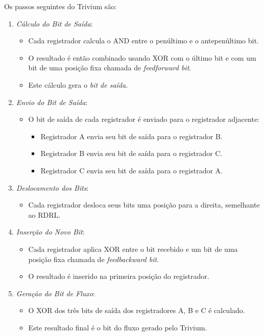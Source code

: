 Os passos seguintes do Trivium são:
\begin{enumerate}
    \item {\em Cálculo do Bit de Saída}:
    \begin{itemize}
        \item Cada registrador calcula o AND entre o penúltimo e o antepenúltimo bit.
        \item O resultado é então combinado usando XOR com o último bit e com um bit de uma posição fixa chamada de {\em feedforward bit}.
        \item Este cálculo gera o \textit{bit de saída}.
    \end{itemize}
    
    \item {\em Envio do Bit de Saída}:
    \begin{itemize}
        \item O bit de saída de cada registrador é enviado para o registrador adjacente:
        \begin{itemize}
            \item Registrador A envia seu bit de saída para o registrador B.
            \item Registrador B envia seu bit de saída para o registrador C.
            \item Registrador C envia seu bit de saída para o registrador A.
        \end{itemize}
    \end{itemize}
    
    \item {\em Deslocamento dos Bits}:
    \begin{itemize}
        \item Cada registrador desloca seus bits uma posição para a direita, semelhante ao RDRL.
    \end{itemize}
    
    \item {\em Inserção do Novo Bit}:
    \begin{itemize}
        \item Cada registrador aplica XOR entre o bit recebido e um bit de uma posição fixa chamada de {\em feedbackward bit}.
        \item O resultado é inserido na primeira posição do registrador.
    \end{itemize}
    
    \item {\em Geração do Bit de Fluxo}:
    \begin{itemize}
        \item O XOR dos três bits de saída dos registradores A, B e C é calculado.
        \item Este resultado final é o bit do fluxo gerado pelo Trivium.
    \end{itemize}
\end{enumerate}


